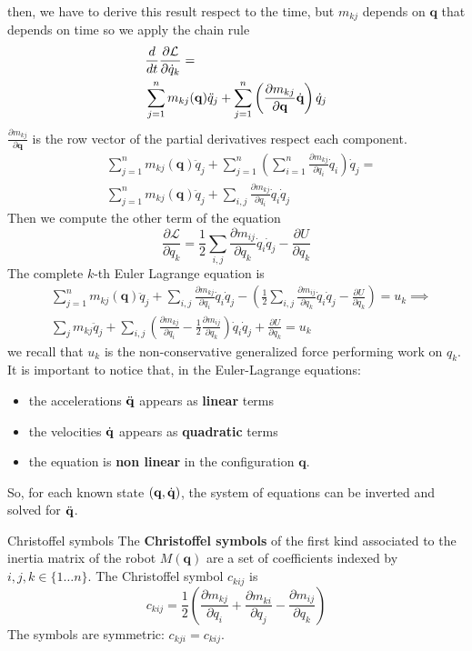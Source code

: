 \documentclass[10pt, a4paper]{report}
\newcommand{\q}{{\mathbf q}}
\begin{document}
then, we have to derive this result respect to the time, but $m_{kj}$ depends on $\q$ that depends on time so we apply the chain rule\begin{align}
    &\frac{d}{dt}\frac{\partial \mathcal L}{\partial \dot q_k}= \\
    &\sum_{j=1}^nm_{kj}(\q)\ddot q_j+
    \sum_{j=1}^n\left(\frac{\partial m_{kj}}{\partial\q}\dq\right) \dot q_j\end{align}
    $\frac{\partial m_{kj}}{\partial\q}$ is the row vector of the partial derivatives respect each component.
    \begin{align}&\sum_{j=1}^nm_{kj}(\q)\ddot q_j+ \sum_{j=1}^n\left(\sum_{i=1}^n\frac{\partial m_{kj}}{\partial q_i}\dot q_i\right) \dot q_j=\\
    &\sum_{j=1}^nm_{kj}(\q)\ddot q_j+ \sum_{i,j}\frac{\partial m_{kj}}{\partial q_i}\dot q_i\dot q_j
\end{align}
Then we compute the other term of the equation\begin{equation}
    \frac{\partial\mathcal L}{\partial q_k}=\frac{1}{2}\sum_{i,j}\frac{\partial m_{ij}}{\partial q_k}\dot q_i\dot q_j-\frac{\partial U}{\partial q_k}
\end{equation}
The complete $k$-th Euler Lagrange equation is\begin{align}
    &\sum_{j=1}^nm_{kj}(\q)\ddot q_j+ \sum_{i,j}\frac{\partial m_{kj}}{\partial q_i}\dot q_i\dot q_j-\left(\frac{1}{2}\sum_{i,j}\frac{\partial m_{ij}}{\partial q_k}\dot q_i\dot q_j-\frac{\partial U}{\partial q_k}\right)=u_k\implies\\ 
    &\sum_jm_{kj}\ddot q_j+\sum_{i,j}\left(
        \frac{\partial m_{kj}}{\partial q_i}-\frac{1}{2}\frac{\partial m_{ij}}{\partial q_k}
    \right)\dot q_i\dot q_j+\frac{\partial U}{\partial q_k}=u_k
\end{align}
we recall that $u_k$ is the non-conservative generalized force performing work on $q_k$. It is important to notice that, in the Euler-Lagrange equations:\begin{itemize}
    \item the accelerations ${\ddot{\mathbf q}}$ appears as \textbf{linear} terms
    \item the velocities ${\dot{\mathbf q}}$ appears as \textbf{quadratic} terms
    \item the equation is \textbf{non linear} in the configuration $\q$.
\end{itemize}
So, for each known state $(\q,\dq)$, the system of equations can be inverted and solved for ${\ddot{\mathbf q}}$.
\begin{boxdefinition}{Christoffel symbols}{}
    The \textbf{Christoffel symbols} of the first kind associated to the inertia matrix of the robot $M(\q)$ are a set of coefficients indexed by $i,j,k\in \{1\dots n\}$. The Christoffel symbol $c_{kij}$ is\begin{equation}
        c_{kij} = \frac{1}{2} \left( \frac{\partial m_{kj}}{\partial q_i} + \frac{\partial m_{ki}}{\partial q_j} - \frac{\partial m_{ij}}{\partial q_k} \right)
    \end{equation}
    The symbols are symmetric: $c_{kji}=c_{kij}$.
\end{boxdefinition}
\end{document}
